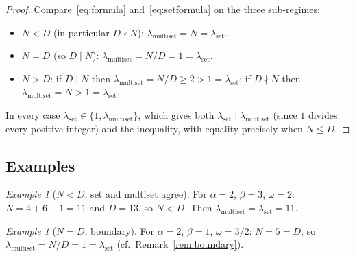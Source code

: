 \documentclass[11pt,reqno]{amsart}
\theoremstyle{plain}
\theoremstyle{definition}
\theoremstyle{remark}
\newtheorem{example}[theorem]{Example}
\begin{document}
\begin{proof}
Compare~\eqref{eq:formula} and~\eqref{eq:setformula} on the three
sub-regimes:
\begin{itemize}
    \item \(N < D\) (in particular \(D \nmid N\)):
          \(\lambda_{\mathrm{multiset}} = N = \lambda_{\mathrm{set}}\).
    \item \(N = D\) (so \(D \mid N\)):
          \(\lambda_{\mathrm{multiset}} = N/D = 1 = \lambda_{\mathrm{set}}\).
    \item \(N > D\): if \(D \mid N\) then
          \(\lambda_{\mathrm{multiset}} = N/D \ge 2 > 1
          = \lambda_{\mathrm{set}}\); if \(D \nmid N\) then
          \(\lambda_{\mathrm{multiset}} = N > 1 = \lambda_{\mathrm{set}}\).
\end{itemize}
In every case \(\lambda_{\mathrm{set}} \in \{1, \lambda_{\mathrm{multiset}}\}\),
which gives both \(\lambda_{\mathrm{set}} \mid \lambda_{\mathrm{multiset}}\)
(since \(1\) divides every positive integer) and the inequality, with
equality precisely when \(N \le D\).
\end{proof}

\subsection{Examples}

\begin{example}[\(N < D\), set and multiset agree]\label{ex:set_lt}
For \(\alpha = 2\), \(\beta = 3\), \(\omega = 2\): \(N = 4 + 6 + 1 = 11\)
and \(D = 13\), so \(N < D\).  Then
\(\lambda_{\mathrm{multiset}} = \lambda_{\mathrm{set}} = 11\).
\end{example}

\begin{example}[\(N = D\), boundary]\label{ex:set_eq}
For \(\alpha = 2\), \(\beta = 1\), \(\omega = 3/2\): \(N = 5 = D\), so
\(\lambda_{\mathrm{multiset}} = N/D = 1 = \lambda_{\mathrm{set}}\)
(cf.\ Remark~\ref{rem:boundary}).
\end{example}
\end{document}
